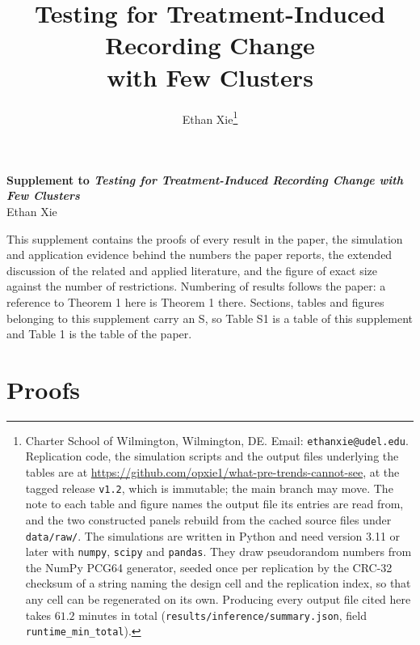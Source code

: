 \documentclass[12pt]{article}
\title{Testing for Treatment-Induced Recording Change\\[2pt]
with Few Clusters}
\author{Ethan Xie\thanks{Charter School of Wilmington, Wilmington, DE.
Email: \texttt{ethanxie@udel.edu}. Replication code, the simulation scripts and
the output files underlying the tables are at
\url{https://github.com/opxie1/what-pre-trends-cannot-see},
at the tagged release \texttt{v1.2}, which is immutable; the main
branch may move. The note to each table and figure names the
output file its entries are read from, and the two constructed panels
rebuild from the cached source files under \texttt{data/raw/}. The simulations are written in Python and need
version 3.11 or later with \texttt{numpy}, \texttt{scipy} and \texttt{pandas}.
They draw pseudorandom numbers from the NumPy PCG64 generator, seeded once per
replication by the CRC-32 checksum of a string naming the design cell and the
replication index, so that any cell can be regenerated on its own. Producing
every output file cited here takes $61.2$ minutes in total
(\texttt{results/inference/summary.json}, field
\texttt{runtime\_min\_total}).}}
\theoremstyle{definition}
\numberwithin{equation}{section}
\begin{document}
\begin{center}

{\large\bfseries Supplement to \emph{Testing for Treatment-Induced Recording Change with Few Clusters}}\\[8pt]

Ethan Xie

\end{center}

\vspace{6pt}

\noindent This supplement contains the proofs of every result in the paper, the simulation and application evidence behind the numbers the paper reports, the extended discussion of the related and applied literature, and the figure of exact size against the number of restrictions. Numbering of results follows the paper: a reference to Theorem 1 here is Theorem 1 there. Sections, tables and figures belonging to this supplement carry an S, so Table S1 is a table of this supplement and Table 1 is the table of the paper.

\vspace{10pt}

\setcounter{section}{0}

\renewcommand{\thesection}{S\arabic{section}}

\setcounter{table}{0}
\setcounter{figure}{0}
\renewcommand{\thetable}{S\arabic{table}}
\renewcommand{\thefigure}{S\arabic{figure}}


\section{Proofs}
\end{document}
